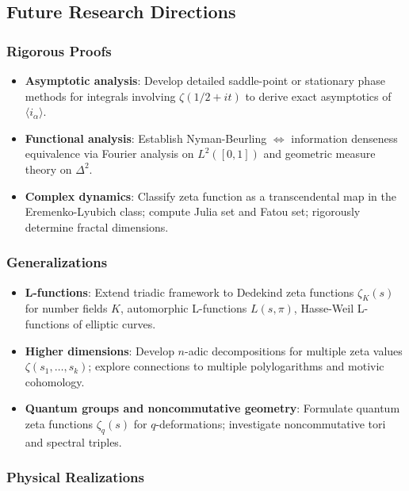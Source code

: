 \documentclass[12pt]{article}
\theoremstyle{plain}
\theoremstyle{definition}
\begin{document}
\subsection{Future Research Directions}

\subsubsection{Rigorous Proofs}

\begin{itemize}
\item \textbf{Asymptotic analysis}: Develop detailed saddle-point or stationary phase methods for integrals involving $\zeta(1/2+it)$ to derive exact asymptotics of $\langle i_\alpha \rangle$.

\item \textbf{Functional analysis}: Establish Nyman-Beurling $\Leftrightarrow$ information denseness equivalence via Fourier analysis on $L^2([0,1])$ and geometric measure theory on $\Delta^2$.

\item \textbf{Complex dynamics}: Classify zeta function as a transcendental map in the Eremenko-Lyubich class; compute Julia set and Fatou set; rigorously determine fractal dimensions.
\end{itemize}

\subsubsection{Generalizations}

\begin{itemize}
\item \textbf{L-functions}: Extend triadic framework to Dedekind zeta functions $\zeta_K(s)$ for number fields $K$, automorphic L-functions $L(s, \pi)$, Hasse-Weil L-functions of elliptic curves.

\item \textbf{Higher dimensions}: Develop $n$-adic decompositions for multiple zeta values $\zeta(s_1, \ldots, s_k)$; explore connections to multiple polylogarithms and motivic cohomology.

\item \textbf{Quantum groups and noncommutative geometry}: Formulate quantum zeta functions $\zeta_q(s)$ for $q$-deformations; investigate noncommutative tori and spectral triples.
\end{itemize}

\subsubsection{Physical Realizations}
\end{document}
